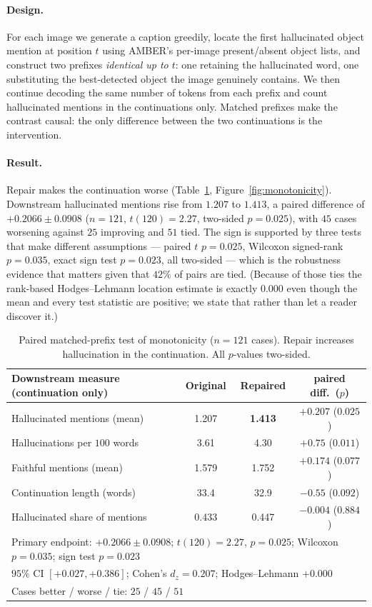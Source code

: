 \documentclass{article}
\theoremstyle{plain}
\theoremstyle{definition}
\theoremstyle{remark}
\begin{document}
\paragraph{Design.}
For each image we generate a caption greedily, locate the first hallucinated object mention
at position $t$ using AMBER's per-image present/absent object lists, and construct two
prefixes \emph{identical up to $t$}: one retaining the hallucinated word, one substituting
the best-detected object the image genuinely contains. We then continue decoding the same
number of tokens from each prefix and count hallucinated mentions in the continuations
only. Matched prefixes make the contrast causal: the only difference between the two
continuations is the intervention.

\paragraph{Result.}
Repair makes the continuation worse (Table~\ref{tab:monotone},
Figure~\ref{fig:monotonicity}). Downstream hallucinated mentions rise from $1.207$ to
$1.413$, a paired difference of $+0.2066\pm0.0908$ ($n=121$, $t(120)=2.27$, two-sided
$p=0.025$), with $45$ cases worsening against $25$ improving and $51$ tied. The sign is
supported by three tests that make different assumptions --- paired $t$ $p=0.025$, Wilcoxon
signed-rank $p=0.035$, exact sign test $p=0.023$, all two-sided --- which is the robustness
evidence that matters given that $42\%$ of pairs are tied. (Because of those ties the
rank-based Hodges--Lehmann location estimate is exactly $0.000$ even though the mean and every
test statistic are positive; we state that rather than let a reader discover it.)

\begin{table}[t]
\centering
\caption{Paired matched-prefix test of monotonicity ($n=121$ cases). Repair increases
hallucination in the continuation. All $p$-values two-sided.}
\label{tab:monotone}
\begin{tabular}{lccc}
\toprule
Downstream measure (continuation only) & Original & Repaired & paired diff.\ ($p$)\\
\midrule
Hallucinated mentions (mean)      & 1.207 & \textbf{1.413} & $+0.207$ ($0.025$)\\
Hallucinations per $100$ words    & 3.61  & 4.30  & $+0.75$ ($0.011$)\\
Faithful mentions (mean)          & 1.579 & 1.752 & $+0.174$ ($0.077$)\\
Continuation length (words)       & 33.4  & 32.9  & $-0.55$ ($0.092$)\\
Hallucinated share of mentions    & 0.433 & 0.447 & $-0.004$ ($0.884$)\\
\midrule
\multicolumn{4}{l}{Primary endpoint: $+0.2066\pm0.0908$; $t(120)=2.27$, $p=0.025$; Wilcoxon
$p=0.035$; sign test $p=0.023$}\\
\multicolumn{4}{l}{$95\%$ CI $[+0.027,+0.386]$; Cohen's $d_z=0.207$; Hodges--Lehmann $+0.000$}\\
\multicolumn{4}{l}{Cases better / worse / tie: $25$ / $45$ / $51$}\\
\bottomrule
\end{tabular}
\end{table}
\end{document}
